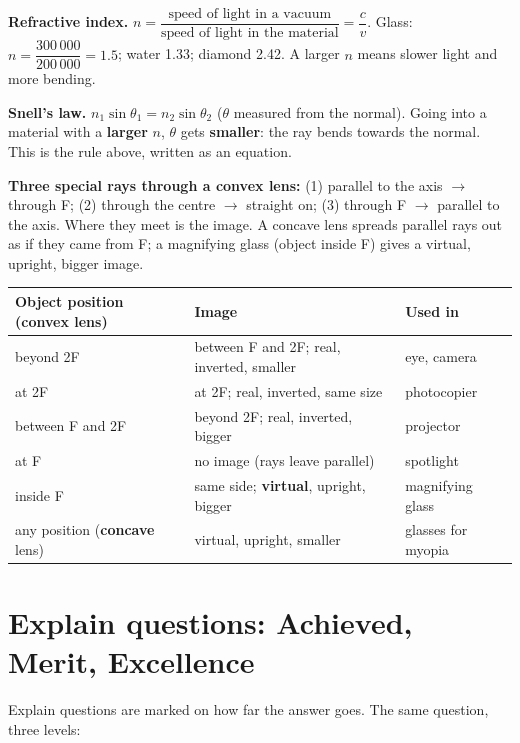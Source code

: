 \documentclass[11pt]{article}
\begin{document}
\begin{extbox}[title={Beyond Year 9 \textperiodcentered{} for interest only, not in the Year 9 exam}]\label{sec:beyond}
\small
\textbf{Refractive index.} $n = \dfrac{\text{speed of light in a vacuum}}{\text{speed of light in the material}} = \dfrac{c}{v}$. Glass: $n = \dfrac{300\,000}{200\,000} = 1.5$; water 1.33; diamond 2.42. A larger $n$ means slower light and more bending.

\textbf{Snell's law.} $n_1 \sin\theta_1 = n_2 \sin\theta_2$ ($\theta$ measured from the normal). Going into a material with a \textbf{larger} $n$, $\theta$ gets \textbf{smaller}: the ray bends towards the normal. This is the rule above, written as an equation.

\textbf{Three special rays through a convex lens:}
(1) parallel to the axis $\to$ through F;
(2) through the centre $\to$ straight on;
(3) through F $\to$ parallel to the axis.
Where they meet is the image. A concave lens spreads parallel rays out as if they came from F; a magnifying glass (object inside F) gives a virtual, upright, bigger image.
\begin{center}\FigLensRays[6.2mm]\end{center}

\medskip
\begin{tabularx}{\linewidth}{@{}l l X@{}}
\toprule
\textbf{Object position (convex lens)} & \textbf{Image} & \textbf{Used in}\\
\midrule
beyond 2F & between F and 2F; real, inverted, smaller & eye, camera\\
at 2F & at 2F; real, inverted, same size & photocopier\\
between F and 2F & beyond 2F; real, inverted, bigger & projector\\
at F & no image (rays leave parallel) & spotlight\\
inside F & same side; \textbf{virtual}, upright, bigger & magnifying glass\\
any position (\textbf{concave} lens) & virtual, upright, smaller & glasses for myopia\\
\bottomrule
\end{tabularx}

\begin{center}\FigConcave[5.4mm]\hspace{10mm}\FigMagnifier[5.4mm]\end{center}
\end{extbox}

\section{Explain questions: Achieved, Merit, Excellence}\label{sec:ame}
Explain questions are marked on how far the answer goes. The same question, three levels:
\end{document}
